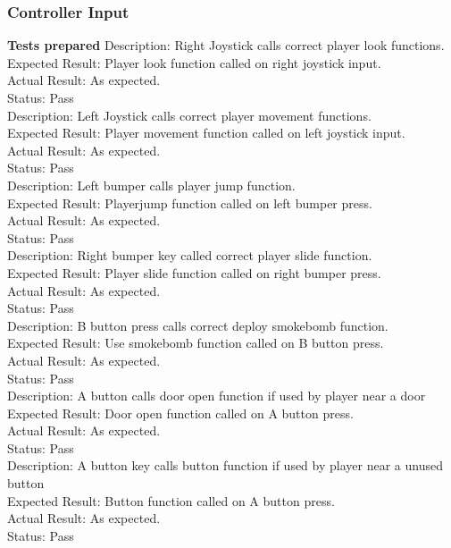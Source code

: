 \documentclass[11pt,a4paper]{article}
\begin{document}
\subsubsection{Controller Input}
\textbf{Tests prepared}
Description: Right Joystick calls correct player look functions.\\
Expected Result: Player look function called on right joystick input.\\
Actual Result: As expected.\\
Status: Pass
\smallskip\\
Description: Left Joystick calls correct player movement functions.\\
Expected Result: Player movement function called on left joystick input.\\
Actual Result: As expected.\\
Status: Pass
\smallskip\\
Description: Left bumper calls player jump function.\\
Expected Result: Playerjump function called on left bumper press.\\
Actual Result: As expected.\\
Status: Pass
\smallskip\\
Description: Right bumper key called correct player slide function.\\
Expected Result: Player slide function called on right bumper press.\\
Actual Result: As expected.\\
Status: Pass
\smallskip\\
Description: B button press calls correct deploy smokebomb function.\\
Expected Result: Use smokebomb function called on B button press.\\
Actual Result: As expected.\\
Status: Pass
\smallskip\\
Description: A button calls door open function if used by player near a door\\
Expected Result: Door open function called on A button press.\\
Actual Result: As expected.\\
Status: Pass
\smallskip\\
Description: A button key calls button function if used by player near a unused button\\
Expected Result: Button function called on A button press.\\
Actual Result: As expected.\\
Status: Pass
\end{document}
